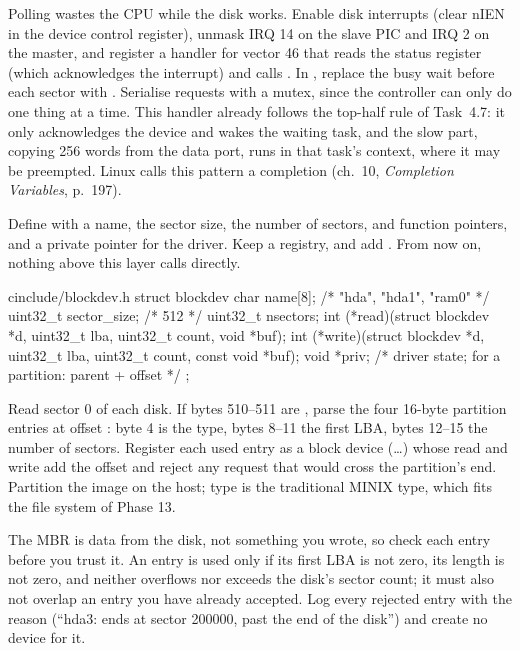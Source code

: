 \documentclass[11pt,a4paper]{article}
\begin{document}
Polling wastes the CPU while the disk works. Enable disk interrupts (clear nIEN in the device control register),
unmask IRQ 14 on the slave PIC and IRQ 2 on the master, and register a handler for vector 46 that reads the status
register (which acknowledges the interrupt) and calls . In , replace the busy wait before
each sector with . Serialise requests with a mutex, since the controller can only do one thing at a
time. This handler already follows the top-half rule of Task~4.7: it only acknowledges the device and wakes the
waiting task, and the slow part, copying 256 words from the data port, runs in that task's context, where it may be
preempted. Linux calls this pattern a completion (\LKD ch.~10, \emph{Completion Variables}, p.~197).

Define  with a name, the sector size, the number of sectors,  and 
function pointers, and a private pointer for the driver. Keep a registry, and add . From
now on, nothing above this layer calls  directly.

\begin{lst}{c}{include/blockdev.h}
struct blockdev {
    char     name[8];                   /* "hda", "hda1", "ram0" */
    uint32_t sector_size;               /* 512                   */
    uint32_t nsectors;
    int    (*read)(struct blockdev *d, uint32_t lba, uint32_t count, void *buf);
    int    (*write)(struct blockdev *d, uint32_t lba, uint32_t count, const void *buf);
    void    *priv;                      /* driver state; for a partition: parent + offset */
};
\end{lst}

Read sector 0 of each disk. If bytes 510--511 are , parse the four 16-byte partition entries at offset
: byte 4 is the type, bytes 8--11 the first LBA, bytes 12--15 the number of sectors. Register each used
entry as a block device (\dots{}) whose read and write add the offset and reject any request that
would cross the partition's end. Partition the image on the host; type  is the traditional MINIX type, which
fits the file system of Phase 13.

The MBR is data from the disk, not something you wrote, so check each entry before you trust it. An entry is used only
if its first LBA is not zero, its length is not zero, and  neither overflows nor exceeds the
disk's sector count; it must also not overlap an entry you have already accepted. Log every rejected entry with the
reason (``hda3: ends at sector 200000, past the end of the disk'') and create no device for it.
\end{document}
